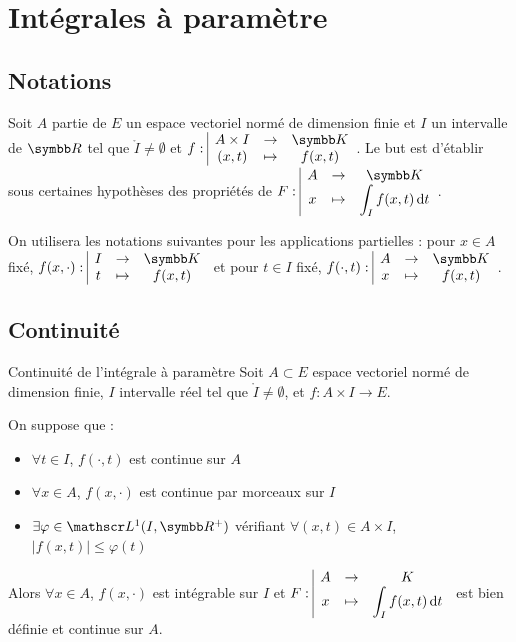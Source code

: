 \section{Intégrales à paramètre}
\subsection{Notations }

Soit $A$ partie de $E$ un espace vectoriel normé de dimension finie et $I$ un 
intervalle de $\R$ tel que $\mathring I \neq \emptyset$ et 
$\fonction f {A \times I} \K {(x, t)}{f(x, t)}$. Le but est d'établir sous 
certaines hypothèses des propriétés de $\fonction F A \K x {\int_I f(x, t) \dt}$.

On utilisera les notations suivantes pour les applications partielles : 
pour $x \in A$ fixé, $\fonction {f(x, \cdot)}{I}{\K}{t}{f(x, t)}$ et pour $t \in I$ fixé, $\fonction {f(\cdot, t)}{A}{\K}{x}{f(x, t)}$.

\subsection{Continuité }

\begin{theoreme}{Continuité de l'intégrale à paramètre}{}
    Soit $A \subset E$ espace vectoriel normé de dimension finie, $I$ intervalle réel tel que 
    $\mathring I \neq \emptyset$, et $f : A \times I \to E$. 

    On suppose que : 
    \begin{itemize}
        \item $\forall t \in I$, $f(\cdot, t)$ est continue sur $A$
        \item $\forall x \in A$, $f(x, \cdot)$ est continue par morceaux sur $I$ 
        \item $\exists \varphi \in \mathscr L^1(I, \R^+)$ vérifiant $\forall (x, t) \in A \times I$, $|f(x, t)| \leqslant \varphi(t)$
    \end{itemize}

    Alors $\forall x \in A$, $f(x, \cdot)$ est intégrable sur $I$ et $F: \space \begin{array}{|ccc} \displaystyle A & \to & \displaystyle K \\ \displaystyle x & \mapsto & \displaystyle \int_I f(x, t) \,\mathrm{d}t \end{array}$ est 
    bien définie et continue sur $A$.
\end{theoreme}

